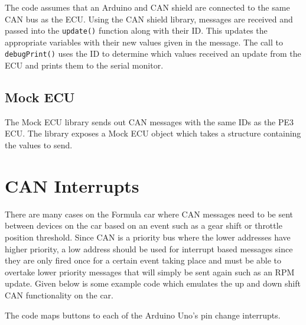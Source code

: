 \documentclass[letterpaper]{article}
\begin{document}
\lstset{basicstyle=\ttfamily\scriptsize}

\lstset{basicstyle=\ttfamily}

The code assumes that an Arduino and CAN shield are connected to the same CAN
bus as the ECU. Using the CAN shield library, messages are received and passed
into the \lstinline{update()} function along with their ID. This updates the
appropriate variables with their new values given in the message. The call to
\lstinline{debugPrint()} uses the ID to determine which values received an
update from the ECU and prints them to the serial monitor.

\subsection{Mock ECU}
The Mock ECU library sends out CAN messages with the same IDs as the PE3 ECU.
The library exposes a Mock ECU object which takes a structure containing the values
to send. 

\section{CAN Interrupts}
There are many cases on the Formula car where CAN messages need to be sent
between devices on the car based on an event such as a gear shift or throttle
position threshold. Since CAN is a priority bus where the lower addresses have
higher priority, a low address should be used for interrupt based messages since
they are only fired once for a certain event taking place and must be able to
overtake lower priority messages that will simply be sent again such as an RPM
update. Given below is some example code which emulates the up and down shift
CAN functionality on the car. 

\lstset{basicstyle=\ttfamily\scriptsize}


The code maps buttons to each of the Arduino Uno's pin change interrupts. 
\end{document}

